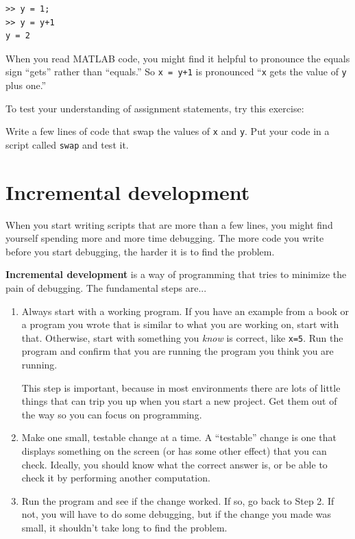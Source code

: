 \documentclass[
]{book}
\begin{document}
\begin{verbatim}
>> y = 1;
>> y = y+1
y = 2
\end{verbatim}

When you read MATLAB code, you might find it helpful to pronounce
the equals sign ``gets'' rather than ``equals.''  So {\tt x = y+1}
is pronounced ``{\tt x} gets the value of {\tt y} plus one.''

To test your understanding of assignment statements, try this
exercise:

\begin{ex}
Write a few lines of code that swap the values of
{\tt x} and {\tt y}.  Put your code in a script called {\tt swap}
and test it.
\end{ex}

\section{Incremental development}

When you start writing scripts that are more than a few lines, you
might find yourself spending more and more time debugging.  The more
code you write before you start debugging, the harder it is to find
the problem.

{\bf Incremental development} is a way of programming that tries
to minimize the pain of debugging.  The fundamental steps are...

\begin{enumerate}

\item Always start with a working program.  If you have an
example from a book or a program you wrote that is similar to
what you are working on, start with that.  Otherwise, start with
something you {\em know} is correct, like {\tt x=5}.  Run the program
and confirm that you are running the program you think you are
running.

This step is important, because in most environments there
are lots of little things that can trip you up when you start a new
project.  Get them out of the way so you can focus on programming.

\item Make one small, testable change at a time.  A ``testable''
change is one that displays something on the screen (or has some
other effect) that you can check.  Ideally, you should know what
the correct answer is, or be able to check it by performing another
computation.

\item Run the program and see if the change worked.  If so, go back
to Step 2.  If not, you will have to do some debugging, but if the
change you made was small, it shouldn't take long to find the problem.

\end{enumerate}
\end{document}
